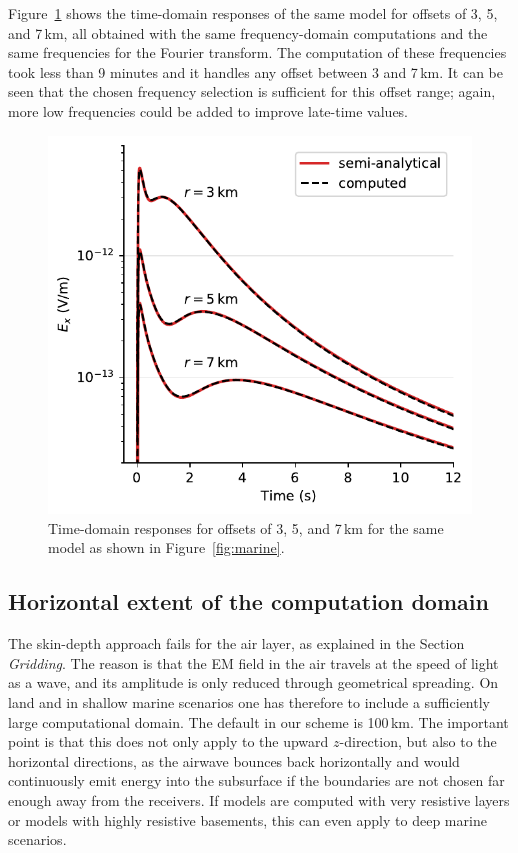 \documentclass[extra, camera,%
    onecolumn,   %
    referee,     %
]{gji}
\newlength{\cwidth}
\begin{document}
Figure~\ref{fig:marine-multioffset} shows the time-domain responses of the same
model for offsets of 3, 5, and 7\,km, all obtained with the same
frequency-domain computations and the same frequencies for the Fourier
transform. The computation of these frequencies took less than 9 minutes and it
handles any offset between 3 and 7\,km. It can be seen that the chosen
frequency selection is sufficient for this offset range; again, more low
frequencies could be added to improve late-time values.
%
\begin{figure}
  \centering
  \includegraphics[width=\cwidth]{07-marine-multioffset}
  \caption{Time-domain responses for offsets of 3, 5, and 7\,km for the same
    model as shown in Figure~\ref{fig:marine}.}
  \label{fig:marine-multioffset}
\end{figure}
%


\subsection{Horizontal extent of the computation domain}  %

The skin-depth approach fails for the air layer, as explained in the Section
\emph{Gridding}. The reason is that the EM field in the air travels at the
speed of light as a wave, and its amplitude is only reduced through geometrical
spreading. On land and in shallow marine scenarios one has therefore to include
a sufficiently large computational domain. The default in our scheme is
100\,km. The important point is that this does not only apply to the upward
$z$-direction, but also to the horizontal directions, as the airwave bounces
back horizontally and would continuously emit energy into the subsurface if the
boundaries are not chosen far enough away from the receivers. If models are
computed with very resistive layers or models with highly resistive basements,
this can even apply to deep marine scenarios.
\end{document}
